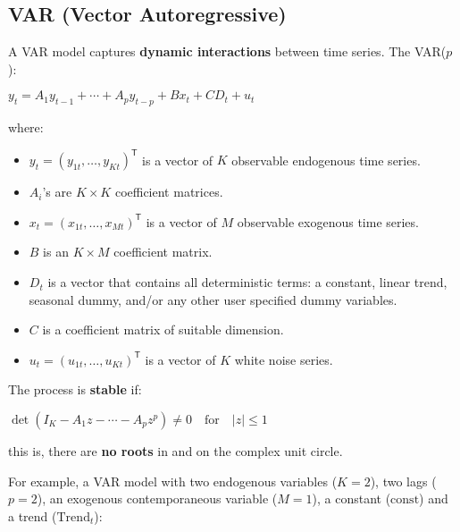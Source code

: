 \documentclass[10pt, a4paper, landscape]{article}
\newcommand{\tr}{\mathsf{T}}
\begin{document}
	\begin{multicols}{2}
		\section*{VAR (Vector Autoregressive)}
		
		A VAR model captures \textbf{dynamic interactions} between time series. The VAR($p$):
		
		\begin{center}
			$y_{t} = A_{1} y_{t - 1}+ \cdots + A_{p} y_{t - p} + B x_{t} + CD_{t} + u_{t}$
		\end{center}
		
		where:
		
		\begin{itemize}[leftmargin=*]
			\item $y_{t} = (y_{1t}, \ldots, y_{Kt})^{\tr}$ is a vector of $K$ observable endogenous time series.
			\item $A_{i}$'s are $K \times K$ coefficient matrices.
			\item $x_{t} = (x_{1t}, \ldots, x_{Mt})^{\tr}$ is a vector of $M$ observable exogenous time series.
			\item $B$ is an $K \times M$ coefficient matrix.
			\item $D_{t}$ is a vector that contains all deterministic terms: a constant, linear trend, seasonal dummy, and/or any other user specified dummy variables.
			\item $C$ is a coefficient matrix of suitable dimension.
			\item $u_{t} = (u_{1t}, \ldots, u_{Kt})^{\tr}$ is a vector of $K$ white noise series.
		\end{itemize}
		
		The process is \textbf{stable} if:
		
		\begin{center}
			$\det(I_{K} - A_{1} z - \cdots - A_{p} z^{p}) \neq 0 \quad \mathrm{for}\quad \lvert z \rvert \leq 1$
		\end{center}
		
		\quad this is, there are \textbf{no roots} in and on the complex unit circle.
		
		For example, a VAR model with two endogenous variables ($K = 2$), two lags ($p = 2$), an exogenous contemporaneous variable ($M = 1$), a constant ($\mathrm{const}$) and a trend ($\mathrm{Trend}_{t}$):
		

\end{multicols}
\end{document}
